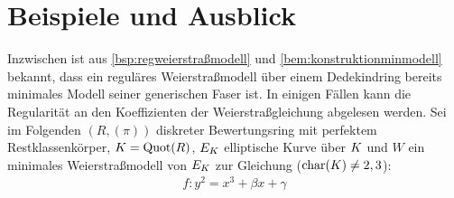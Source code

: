 \chapter{Beispiele und Ausblick}\label{chap:ausblick}
Inzwischen ist aus \ref{bsp:regweierstraßmodell} und
\ref{bem:konstruktionminmodell} bekannt, dass ein reguläres
Weierstraßmodell über einem Dedekindring bereits minimales Modell
seiner generischen Faser ist.
In einigen Fällen kann die Regularität an den
Koeffizienten der Weierstraßgleichung abgelesen werden.
Sei im Folgenden $(R,(\pi))$ diskreter Bewertungsring mit perfektem
Restklassenkörper, $K=\operatorname{Quot}(R)$, $E_{K}$ elliptische Kurve über $K$
und $W$ ein minimales Weierstraßmodell von $E_{K}$ zur Gleichung
($\operatorname{char}(K)\neq2,3$):
\begin{gather}\label{eq:allgweierstraßgleichung}
  f\colon y^2=x^3 + \beta x + \gamma
\end{gather}


